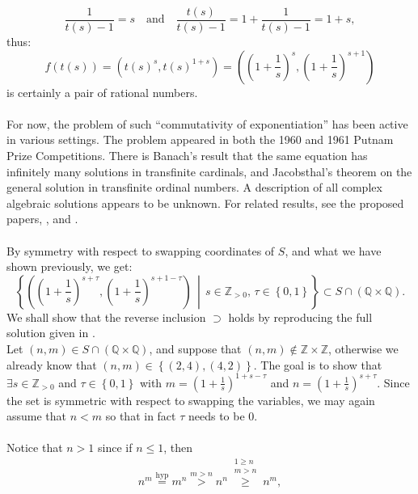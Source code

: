 \begin{solution}
    \[
        \frac{1}{t\left(s\right) - 1} = s \quad \text{and} \quad \frac{t\left(s\right)}{t\left(s\right) - 1} = 1 + \frac{1}{t\left(s\right) - 1} = 1 + s,
    \]
    thus:
    \[
        f\left( t\left(s\right) \right) = \left( t\left(s\right)^{s}, t\left(s\right)^{1 + s} \right) = \left( \left(1 + \frac{1}{s} \right)^{s}, \left(1 + \frac{1}{s} \right)^{s + 1} \right)
    \]
    is certainly a pair of rational numbers.
    \\\\
    For now, the problem of such ``commutativity of exponentiation'' has been active in various settings. The problem appeared in both the 1960 and 1961 Putnam Prize Competitions. There is Banach's result that the same equation has infinitely many solutions in transfinite cardinals, and Jacobsthal's theorem on the general solution in transfinite ordinal numbers. A description of all complex algebraic solutions appears to be unknown. For related results, see the proposed papers, \cite{bennett2002reznick}, and \cite{alvin1961hausner}.
    \\\\
    By symmetry with respect to swapping coordinates of \( S \), and what we have shown previously, we get:
    \[
        \left\{ \left( \left(1 + \frac{1}{s} \right)^{s+\tau}, \left(1 + \frac{1}{s} \right)^{s + 1-\tau} \right) \,\middle|\, s \in \mathbb{Z}_{>0},\, \tau \in \left\{ 0, 1 \right\} \right\} \subset S \cap \left( \mathbb{Q} \times \mathbb{Q} \right).
    \]
    We shall show that the reverse inclusion \( \supset \) holds by reproducing the full solution given in \cite{solomon1967Hurwitz}. \\
    Let \( \left( n, m \right) \in S \cap \left( \mathbb{Q} \times \mathbb{Q} \right) \), and suppose that \( \left(n, m\right) \notin \mathbb{Z} \times \mathbb{Z} \), otherwise we already know that \( \left(n, m\right) \in \left\{ \left(2, 4\right), \left(4, 2\right) \right\} \). The goal is to show that \( \exists s \in \mathbb{Z}_{>0} \) and \( \tau\in\left\{0,1\right\} \) with \( m = \left(1 + \frac{1}{s} \right)^{1+s-\tau} \) and \( n = \left(1 + \frac{1}{s} \right)^{s+\tau} \). Since the set is symmetric with respect to swapping the variables, we may again assume that \( n < m \) so that in fact \( \tau \) needs to be \( 0 \).
    \\\\
    Notice that \( n>1 \) since if \( n \leq 1 \), then
    \[
        n^m \overset{\text{hyp}}{=} m^n \overset{m > n}{>} n^n \overset{\substack{1 \geq n \\ m > n}}{\geq} n^m,
\]
\end{solution}
